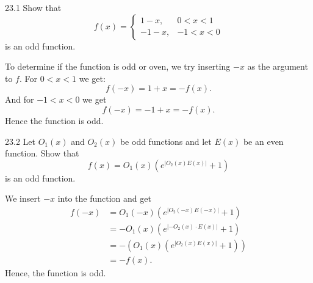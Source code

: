 
\begin{problem}{23.1}
  Show that
  \begin{equation*}
    f(x) = \begin{cases}
      1-x,  & 0 < x < 1\\
    -1-x, & -1 < x < 0
    \end{cases}
  \end{equation*}
  is an odd function.
\end{problem}

\begin{derivation}
  To determine if the function is odd or oven, we try inserting $-x$ as the argument to $f$.
  For $0<x<1$ we get:
  \begin{equation*}
    f(-x) = 1 + x = - f(x)
  .\end{equation*}
  And for $-1 < x < 0$ we get
  \begin{equation*}
    f(-x) = - 1 + x = -f(x)
  .\end{equation*}
  Hence the function is odd.
\end{derivation}

\newpage

\begin{problem}{23.2}
  Let $O_1(x)$ and $O_2(x)$ be odd functions and let $E(x)$ be an even function.
  Show that
  \begin{equation*}
    f(x) = O_1(x) \left( e^{\left| O_2 (x) E(x) \right|} + 1 \right)
  \end{equation*}
  is an odd function.
\end{problem}

\begin{derivation}
  We insert $-x$ into the function and get
  \begin{align*}
    f(-x) &= O_1(-x) \left( e^{\left| O_2(-x) E(-x) \right|} + 1 \right) \\
    &= - O_1(x) \left( e^{\left| - O_2(x) \cdot E(x) \right|} + 1 \right) \\
    &= - \left( O_1(x) \left( e^{\left| O_2(x) E(x) \right|} + 1 \right) \right) \\
    &= - f(x)
  .\end{align*}
  Hence, the function is odd.
\end{derivation}

\newpage


